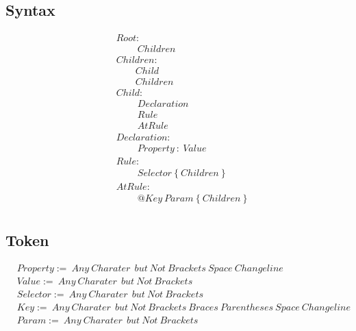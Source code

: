 \documentclass[12pt, a4papaer, AutoFakeBold, AutoFakeSlant]{article}
\begin{document}
\justifying
\subsection*{Syntax}
\begin{align*}
& Root:\\
& \quad\quad \ Children \\
& Children: \\
& \quad \quad Child  \\ 
& \quad \quad Children \\ 
& Child: \\
& \quad\quad \ Declaration \\
& \quad\quad \ Rule \\
& \quad\quad \ AtRule \\
& Declaration: \\
& \quad \quad \ Property \  : \  Value \\
& Rule: \\
& \quad\quad \ Selector\  \{  \ Children \  \} \\
& AtRule: \\
& \quad\quad \  @ Key \ Param  \   \{  \ Children \  \} \\
\end{align*}
\subsection*{Token}
\begin{align*}
& Property := \  Any \ Charater \ \  but \  Not \  Brackets \ Space \ Changeline \\
& Value := \  Any \ Charater \ \  but \  Not \  Brackets \\
& Selector := \  Any \ Charater \ \  but \  Not \  Brackets \\
& Key := \  Any \ Charater \ \  but \  Not \  Brackets \ Braces \ Parentheses \ Space \ Changeline \\
& Param :=  \  Any \ Charater \ \  but \  Not \  Brackets \\
\end{align*}
\end{document}
